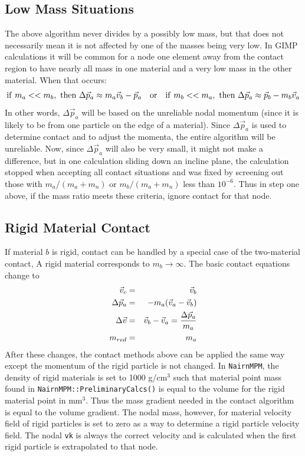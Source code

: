 \documentclass[11pt]{article}
\begin{document}
\subsection{Low Mass Situations}

The above algorithm never divides by a possibly low mass, but that does not necessarily mean it is not affected by one of the masses being very low. In GIMP calculations it will be common for a node one element away from the contact region to have nearly all mass in one material and a very low mass in the other material. When that occurs:
\begin{equation}
         {\rm if\ } m_a << m_b, {\rm\ then\ } \Delta \vec p_a \approx m_a\vec v_b -\vec p_a
         \quad {\rm or}\quad
         {\rm if\ } m_b << m_a, {\rm\ then\ } \Delta \vec p_a \approx \vec p_b - m_b \vec v_a
\end{equation}
In other words, $\Delta\vec p_a$ will be based on the unreliable nodal momentum (since it is likely to be from one particle on the edge of a material). Since $\Delta\vec p_a$ is used to determine contact and to adjust the momenta, the entire algorithm will be unreliable. Now, since $\Delta\vec p_a$ will also be very small, it might not make a difference, but in one calculation sliding down an incline plane, the calculation stopped when accepting all contact situations and was fixed by screening out those with $m_a/(m_a+m_n)$ or $m_b/(m_a+m_n)$ less than $10^{-6}$. Thus in step one above, if the mass ratio meets these criteria, ignore contact for that node.

\subsection{Rigid Material Contact}

If material $b$ is rigid, contact can be handled by a special case of the two-material contact, A rigid material corresponds to $m_b\to\infty$. The basic contact equations change to
\begin{eqnarray}
     \vec v_c & = &  \vec v_b \\
     \Delta \vec p_a & = & -m_a(\vec v_a -\vec v_b) \\
     \Delta \vec v & = & \vec v_b - \vec v_a  = {\Delta\vec p_a\over m_a} \\
     m_{red} & = & m_a
\end{eqnarray}
After these changes, the contact methods above can be applied the same way except the momentum of the rigid particle is not changed. In {\tt NairnMPM}, the density of rigid materials is set to 1000 g/cm$^3$ such that material point mass found in {\tt NairnMPM::PreliminaryCalcs()} is equal to the volume for the rigid material point in mm$^3$. Thus the mass gradient needed in the contact algorithm is equal to the volume gradient. The nodal mass, however, for material velocity field of rigid particles is set to zero as a way to determine a rigid particle velocity field. The nodal {\tt vk} is always the correct velocity and is calculated when the first rigid particle is extrapolated to that node.
\end{document}
